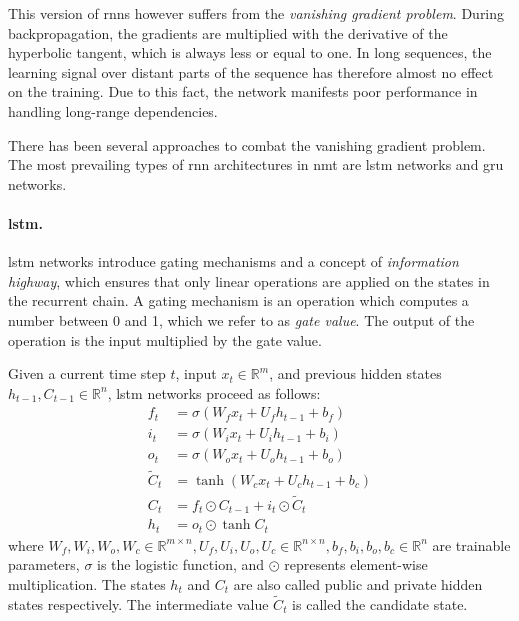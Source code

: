 This version of \glspl{rnn} however suffers from the \emph{vanishing gradient
problem}. During backpropagation, the gradients are multiplied with the
derivative of the hyperbolic tangent, which is always less or equal to one. In
long sequences, the learning signal over distant parts of the sequence has
therefore almost no effect on the training. Due to this fact, the network
manifests poor performance in handling long-range dependencies.

There has been several approaches to combat the vanishing gradient problem.  The
most prevailing types of \gls{rnn} architectures in \gls{nmt} are \gls{lstm}
networks and \gls{gru} networks.

\paragraph{\acrshort{lstm}.} \acrlong{lstm} networks \citep{hochreiter1997long}
introduce gating mechanisms and a concept of \emph{information highway}, which
ensures that only linear operations are applied on the states in the recurrent
chain. A gating mechanism is an operation which computes a number between 0 and
1, which we refer to as \emph{gate value}.  The output of the operation is the
input multiplied by the gate value.

Given a current time step $t$, input $x_t \in \mathbb{R}^m$, and previous hidden
states $h_{t-1}, C_{t-1} \in \mathbb{R}^n$, \gls{lstm} networks proceed as
follows:
%
\begin{align}
  f_t &= \sigma\left(W_f x_t + U_f h_{t-1} + b_f\right) \label{eq:lstm-forget-gate} \\
  i_t &= \sigma\left(W_i x_t + U_i h_{t-1} + b_i\right) \label{eq:lstm-input-gate} \\
  o_t &= \sigma\left(W_o x_t + U_o h_{t-1} + b_o\right) \label{eq:lstm-output-gate} \\
  \tilde{C}_t &= \tanh \left( W_c x_t + U_c h_{t-1} + b_c \right) \label{eq:lstm-candidate} \\
  C_t &= f_t \odot C_{t-1} + i_t \odot \tilde{C}_t \label{eq:lstm-information-highway} \\
  h_t &= o_t \odot \tanh C_t \label{eq:lstm-hidden-state}
\end{align}
%
where $W_f, W_i, W_o, W_c \in \mathbb{R}^{m \times n}, U_f, U_i, U_o, U_c \in
\mathbb{R}^{n \times n}, b_f, b_i, b_o, b_c \in \mathbb{R}^n$ are trainable
parameters, $\sigma$ is the logistic function, and $\odot$ represents
element-wise multiplication. The states $h_t$ and $C_t$ are also called public
and private hidden states respectively. The intermediate value $\tilde{C}_t$ is
called the candidate state.

